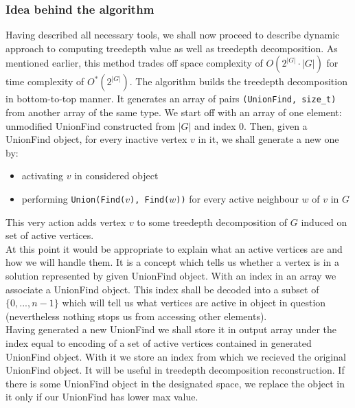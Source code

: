\subsubsection{Idea behind the algorithm}
Having described all necessary tools, we shall now proceed to describe dynamic approach to computing treedepth value as well as treedepth decomposition. As mentioned earlier, this method trades off space complexity of $O\left(2^{\left|G\right|}\cdot\left|G\right|\right)$ for time complexity of  $O^{*}\left(2^{\left|G\right|}\right)$.
The algorithm builds the treedepth decomposition in bottom-to-top manner. It generates an array of pairs \texttt{(UnionFind, size\_t)} from another array of the same type. We start off with an array of one element: unmodified UnionFind constructed from $\left|G\right|$ and index 0. Then, given a UnionFind object, for every inactive vertex $v$ in it, we shall generate a new one by:
\begin{itemize}
	\item activating $v$ in considered object
	\item performing \texttt{Union(Find($v$), Find($w$))} for every active neighbour $w$ of $v$ in $G$
\end{itemize}
This very action adds vertex $v$ to some treedepth decomposition of $G$ induced on set of active vertices.\\
At this point it would be appropriate to explain what an active vertices are and how we will handle them. It is a concept which tells us whether a vertex is in a solution represented by given UnionFind object. With an index in an array we associate a UnionFind object. This index shall be decoded into a subset of $\{0,...,n-1\}$ which will tell us what vertices are active in object in question (nevertheless nothing stops us from accessing other elements).\\
Having generated a new UnionFind we shall store it in output array under the index equal to encoding of a set of active vertices contained in generated UnionFind object. With it we store an index from which we recieved the original UnionFind object. It will be useful in treedepth decomposition reconstruction. If there is some UnionFind object in the designated space, we replace the object in it only if our UnionFind has lower max value.
